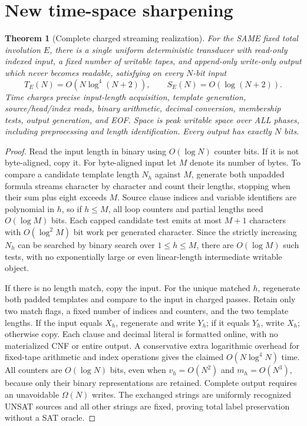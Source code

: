 \documentclass[11pt]{article}
\newtheorem{theorem}{Theorem}
\begin{document}
\section*{New time-space sharpening}
\begin{theorem}[Complete charged streaming realization]
For the SAME fixed total involution $E$, there is a single uniform deterministic transducer with read-only indexed input, a fixed number of writable tapes, and append-only write-only output which never becomes readable, satisfying on every $N$-bit input
\[
T_E(N)=O(N\log^4(N+2)),\qquad S_E(N)=O(\log(N+2)).
\]
Time charges precise input-length acquisition, template generation, source/head/index reads, binary arithmetic, decimal conversion, membership tests, output generation, and EOF. Space is peak writable space over ALL phases, including preprocessing and length identification. Every output has exactly $N$ bits.
\end{theorem}
\begin{proof}
Read the input length in binary using $O(\log N)$ counter bits. If it is not byte-aligned, copy it. For byte-aligned input let $M$ denote its number of bytes. To compare a candidate template length $N_h$ against $M$, generate both unpadded formula streams character by character and count their lengths, stopping when their sum plus eight exceeds $M$. Source clause indices and variable identifiers are polynomial in $h$, so if $h\le M$, all loop counters and partial lengths need $O(\log M)$ bits. Each capped candidate test emits at most $M+1$ characters with $O(\log^2 M)$ bit work per generated character. Since the strictly increasing $N_h$ can be searched by binary search over $1\le h\le M$, there are $O(\log M)$ such tests, with no exponentially large or even linear-length intermediate writable object.

If there is no length match, copy the input. For the unique matched $h$, regenerate both padded templates and compare to the input in charged passes. Retain only two match flags, a fixed number of indices and counters, and the two template lengths. If the input equals $X_h$, regenerate and write $Y_h$; if it equals $Y_h$, write $X_h$; otherwise copy. Each clause and decimal literal is formatted online, with no materialized CNF or entire output. A conservative extra logarithmic overhead for fixed-tape arithmetic and index operations gives the claimed $O(N\log^4 N)$ time. All counters are $O(\log N)$ bits, even when $v_h=O(N^2)$ and $m_h=O(N^3)$, because only their binary representations are retained. Complete output requires an unavoidable $\Omega(N)$ writes. The exchanged strings are uniformly recognized UNSAT sources and all other strings are fixed, proving total label preservation without a SAT oracle.
\end{proof}
\end{document}
